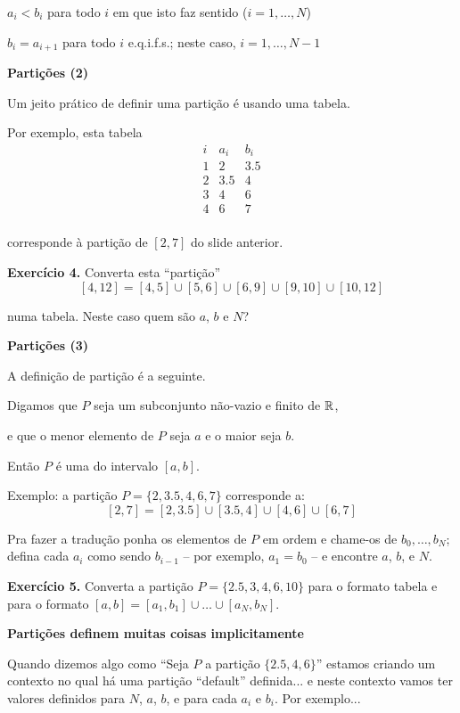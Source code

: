 \documentclass[oneside,12pt]{article}
\begin{document}
$a_i<b_i$ para todo $i$ em que isto faz sentido ($i=1,\ldots,N$)

$b_i=a_{i+1}$ para todo $i$ e.q.i.f.s.; neste caso, $i=1,\ldots,N-1$

\newpage

{\bf Partições (2)}

Um jeito prático de definir uma partição é usando uma tabela.

Por exemplo, esta tabela
%
$$\begin{array}{ccc}
  i & a_i & b_i \\\hline
  1 & 2 & 3.5 \\
  2 & 3.5 & 4 \\
  3 & 4 & 6 \\
  4 & 6 & 7 \\
  \end{array}
$$

corresponde à partição de $[2,7]$ do slide anterior.

{\bf Exercício 4.} Converta esta ``partição''
%
$$[4,12] = [4,5]∪[5,6]∪[6,9]∪[9,10]∪[10,12]$$

numa tabela. Neste caso quem são $a$, $b$ e $N$?

\newpage

{\bf Partições (3)}

A definição  de partição é a seguinte.

Digamos que $P$ seja um subconjunto não-vazio e finito de $\mathbb{R}$,

e que o menor elemento de $P$ seja $a$ e o maior seja $b$.

Então $P$ é uma  do intervalo $[a,b]$.

\msk

Exemplo: a partição $P=\{2,3.5,4,6,7\}$ corresponde a:
%
$$[2,7] = [2,3.5]∪[3.5,4]∪[4,6]∪[6,7]$$

Pra fazer a tradução ponha os elementos de $P$ em ordem e chame-os de
$b_0,\ldots,b_N$; defina cada $a_i$ como sendo $b_{i-1}$ -- por
exemplo, $a_1 = b_0$ -- e encontre $a$, $b$, e $N$.

\msk

{\bf Exercício 5.} Converta a partição $P=\{2.5,3,4,6,10\}$ para o
formato tabela e para o formato $[a,b] = [a_1,b_1]∪\ldots∪[a_N,b_N].$


\newpage

{\bf Partições definem muitas coisas implicitamente}

Quando dizemos algo como ``Seja $P$ a partição $\{2.5,4,6\}$'' estamos
criando um contexto no qual há uma partição ``default'' definida... e
neste contexto vamos ter valores definidos para $N$, $a$, $b$, e para
cada $a_i$ e $b_i$. Por exemplo...
\end{document}
